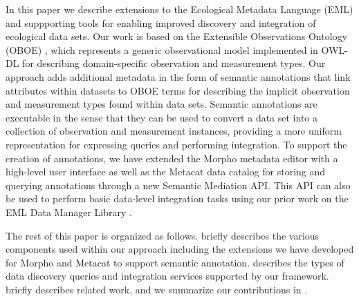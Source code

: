 In this paper we describe extensions to the Ecological Metadata
Language (EML) \cite{Fegraus07} and suppporting tools for enabling
improved discovery and integration of ecological data sets. Our work
is based on the Extensible Observations Ontology (OBOE)
\cite{bowers08,madin07:_ontol_for_descr_and_synth}, which represents a
generic observational model implemented in OWL-DL for describing
domain-specific observation and measurement types. Our approach adds
additional metadata in the form of semantic annotations that link
attributes within datasets to OBOE terms for describing the implicit
observation and measurement types found within data sets. Semantic
annotations are executable in the sense that they can be used to
convert a data set into a collection of observation and measurement
instances, providing a more uniform representation for expressing
queries and performing integration.  To support the creation of
annotations, we have extended the Morpho metadata editor
\cite{metacat02:_manag_heter_ecolog_data_using_morph} with a
high-level user interface as well as the Metacat data catalog
\cite{berkley01:_metac} for storing and querying annotations through a
new Semantic Mediation API. This API can also be used to perform basic
data-level integration tasks using our prior work on the EML Data
Manager Library \cite{leinfelder10:_metad_driven_approac_to_loadin}.

The rest of this paper is organized as follows. 
briefly describes the various components used within our approach
including the extensions we have developed for Morpho and Metacat to
support semantic annotation.  describes the
types of data discovery queries and integration services supported by
our framework.  briefly describes related work,
and we summarize our contributions in .






